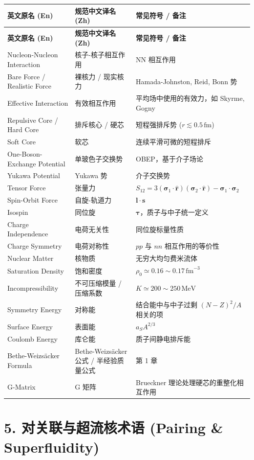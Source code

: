 \begin{longtable}{p{4.8cm} p{4.8cm} p{5.0cm}}
\toprule
\textbf{英文原名 (En)} & \textbf{规范中文译名 (Zh)} & \textbf{常见符号 / 备注} \tabularnewline
\midrule
\endfirsthead
\toprule
\textbf{英文原名 (En)} & \textbf{规范中文译名 (Zh)} & \textbf{常见符号 / 备注} \tabularnewline
\midrule
\endhead
\bottomrule
\endfoot
\bottomrule
\endlastfoot
Nucleon-Nucleon Interaction & 核子-核子相互作用 & NN 相互作用 \tabularnewline
Bare Force / Realistic Force & 裸核力 / 现实核力 & Hamada-Johnston, Reid, Bonn 势 \tabularnewline
Effective Interaction & 有效相互作用 & 平均场中使用的有效力，如 Skyrme, Gogny \tabularnewline
Repulsive Core / Hard Core & 排斥核心 / 硬芯 & 短程强排斥势 ($r \lesssim 0.5\,\text{fm}$) \tabularnewline
Soft Core & 软芯 & 连续平滑可微的短程排斥 \tabularnewline
One-Boson-Exchange Potential & 单玻色子交换势 & OBEP，基于介子场论 \tabularnewline
Yukawa Potential & Yukawa 势 & 介子交换势 \tabularnewline
Tensor Force & 张量力 & $S_{12} = 3(\boldsymbol{\sigma}_1 \cdot \hat{\boldsymbol{r}})(\boldsymbol{\sigma}_2 \cdot \hat{\boldsymbol{r}}) - \boldsymbol{\sigma}_1 \cdot \boldsymbol{\sigma}_2$ \tabularnewline
Spin-Orbit Force & 自旋-轨道力 & $\boldsymbol{l} \cdot \boldsymbol{s}$ \tabularnewline
Isospin & 同位旋 & $\boldsymbol{\tau}$，质子与中子统一定义 \tabularnewline
Charge Independence & 电荷无关性 & 同位旋标量性质 \tabularnewline
Charge Symmetry & 电荷对称性 & $pp$ 与 $nn$ 相互作用的等价性 \tabularnewline
Nuclear Matter & 核物质 & 无穷大均匀费米流体 \tabularnewline
Saturation Density & 饱和密度 & $\rho_0 \simeq 0.16 \sim 0.17\,\text{fm}^{-3}$ \tabularnewline
Incompressibility & 不可压缩模量 / 压缩系数 & $K \simeq 200 \sim 250\,\text{MeV}$ \tabularnewline
Symmetry Energy & 对称能 & 结合能中与中子过剩 $(N-Z)^2/A$ 相关的项 \tabularnewline
Surface Energy & 表面能 & $a_S A^{2/3}$ \tabularnewline
Coulomb Energy & 库仑能 & 质子间静电排斥能 \tabularnewline
Bethe-Weizsäcker Formula & Bethe-Weizsäcker 公式 / 半经验质量公式 & 第 1 章 \tabularnewline
G-Matrix & G 矩阵 & Brueckner 理论处理硬芯的重整化相互作用 \tabularnewline
\end{longtable}

\section*{5. 对关联与超流核术语 (Pairing \& Superfluidity)}

